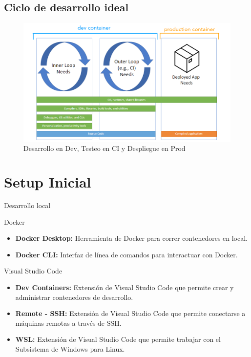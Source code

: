 \documentclass{beamer}
\begin{document}
\subsection{Ciclo de desarrollo ideal}
\begin{frame}{\subsecname}
  \begin{figure}
    \centering
    \includegraphics[width=\textwidth]{images/dev-container-stages.png}
    \caption{Desarrollo en Dev, Testeo en CI y Despliegue en Prod}
  \end{figure}
\end{frame}

\section{Setup Inicial}
\begin{frame}{Desarrollo local}
  \begin{block}{Docker}
    \begin{itemize}
      \item \textbf{Docker Desktop:} Herramienta de Docker para correr contenedores en local.
      \item \textbf{Docker CLI:} Interfaz de línea de comandos para interactuar con Docker.
    \end{itemize}
  \end{block}
  \begin{block}{Visual Studio Code}
    \begin{itemize}
      \item \textbf{Dev Containers:} Extensión de Visual Studio Code que permite crear y administrar contenedores de desarrollo.
      \item \textbf{Remote - SSH:} Extensión de Visual Studio Code que permite conectarse a máquinas remotas a través de SSH.
      \item \textbf{WSL:} Extensión de Visual Studio Code que permite trabajar con el Subsistema de Windows para Linux.
    \end{itemize}
  \end{block}
\end{frame}
\end{document}
